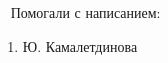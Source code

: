 \tableofcontents
\vfill ~
Помогали с написанием:
\begin{enumerate}
	\item Ю. Камалетдинова
\end{enumerate}
